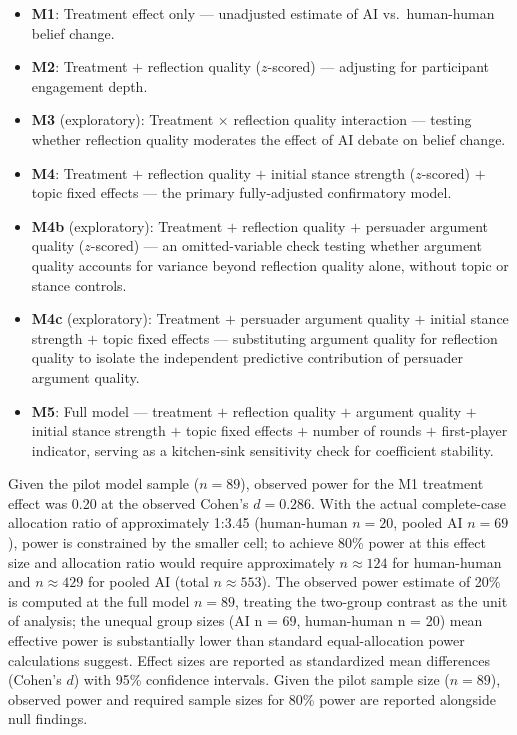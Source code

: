 \begin{itemize}
    \item \textbf{M1}: Treatment effect only — unadjusted estimate of AI
          vs.\ human-human belief change.
    \item \textbf{M2}: Treatment $+$ reflection quality ($z$-scored) —
          adjusting for participant engagement depth.
     \item \textbf{M3} (exploratory): Treatment $\times$ reflection quality
          interaction — testing whether reflection quality moderates the
          effect of AI debate on belief change.
    \item \textbf{M4}: Treatment $+$ reflection quality $+$ initial stance
          strength ($z$-scored) $+$ topic fixed effects — the primary
          fully-adjusted confirmatory model.
    \item \textbf{M4b} (exploratory): Treatment $+$ reflection quality $+$
          persuader argument quality ($z$-scored) — an omitted-variable
          check testing whether argument quality accounts for variance
          beyond reflection quality alone, without topic or stance controls.
    \item \textbf{M4c} (exploratory): Treatment $+$ persuader argument
          quality $+$ initial stance strength $+$ topic fixed effects —
          substituting argument quality for reflection quality to isolate
          the independent predictive contribution of persuader argument
          quality.
    \item \textbf{M5}: Full model — treatment $+$ reflection quality $+$
          argument quality $+$ initial stance strength $+$ topic fixed
          effects $+$ number of rounds $+$ first-player indicator, serving
          as a kitchen-sink sensitivity check for coefficient stability.
\end{itemize}

Given the pilot model sample ($n = 89$),
observed power for the M1 treatment effect was 0.20 at the observed
Cohen's $d = 0.286$. With the actual complete-case allocation ratio of approximately 1:3.45
(human-human $n = 20$, pooled AI $n = 69$),
power is constrained by the smaller cell; to achieve 80\% power at this effect size and allocation ratio
would require approximately $n \approx 124$ for human-human and $n \approx 429$ for pooled AI (total $n \approx 553$).
The observed power estimate of 20\% is computed at the full model $n = 89$,
treating the two-group contrast as the unit of analysis; the unequal group sizes
(AI n = 69, human-human n = 20) mean effective power is substantially lower than
standard equal-allocation power calculations suggest.
Effect sizes are reported as standardized mean differences (Cohen's $d$) with
95\% confidence intervals. Given the pilot sample size ($n = 89$), observed
power and required sample sizes for 80\% power are reported alongside null findings.

